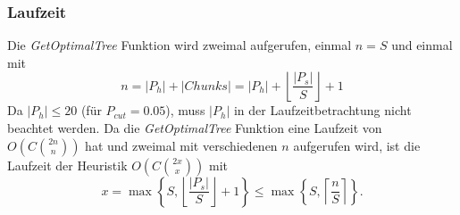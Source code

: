 \documentclass[a4paper,10pt,ngerman]{scrartcl}
\begin{document}
    \subsubsection{Laufzeit}
    Die \textit{GetOptimalTree} Funktion wird zweimal aufgerufen, einmal $n = S$ und einmal mit
    \[n = |P_h| + |Chunks| = |P_h| +  \left\lfloor   \frac {|P_s|} {S}  \right\rfloor + 1\]
    Da $|P_h| \le 20$ (für $P_{cut} = 0.05$), muss $|P_h|$ in der Laufzeitbetrachtung nicht beachtet werden.
    Da die \textit{GetOptimalTree} Funktion eine Laufzeit von $O\left(C{{2n} \choose n}  \right)$ hat und zweimal mit verschiedenen $n$ aufgerufen wird, ist die Laufzeit der Heuristik $O\left(C{{2x} \choose x}  \right)$ mit
    \[x = \max \left\{ S, \left\lfloor   \frac {|P_s|} {S}  \right\rfloor + 1 \right\} \le \max \left\{S, \left\lceil \frac n S \right\rceil \right\}.\]
\end{document}
